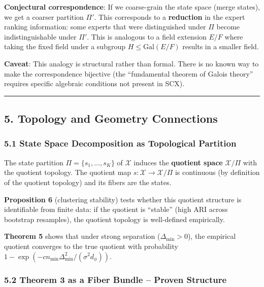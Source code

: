 \documentclass[
  12pt,
]{ctexart}
\begin{document}
\textbf{Conjectural correspondence}: If we coarse-grain the state space
(merge states), we get a coarser partition \(\Pi'\). This corresponds to
a \textbf{reduction} in the expert ranking information: some experts
that were distinguished under \(\Pi\) become indistinguishable under
\(\Pi'\). This is analogous to a field extension \(E/F\) where taking
the fixed field under a subgroup \(H \leq \text{Gal}(E/F)\) results in a
smaller field.

\textbf{Caveat}: This analogy is structural rather than formal. There is
no known way to make the correspondence bijective (the ``fundamental
theorem of Galois theory'' requires specific algebraic conditions not
present in SCX).

\begin{center}\rule{0.5\linewidth}{0.5pt}\end{center}

\subsection{5. Topology and Geometry
Connections}\label{topology-and-geometry-connections}

\subsubsection{5.1 State Space Decomposition as Topological
Partition}\label{state-space-decomposition-as-topological-partition}

The state partition \(\Pi = \{s_1, \dots, s_K\}\) of \(\mathcal{X}\)
induces the \textbf{quotient space} \(\mathcal{X}/\Pi\) with the
quotient topology. The quotient map
\(s: \mathcal{X} \to \mathcal{X}/\Pi\) is continuous (by definition of
the quotient topology) and its fibers are the states.

\textbf{Proposition 6} (clustering stability) tests whether this
quotient structure is identifiable from finite data: if the quotient is
``stable'' (high ARI across bootstrap resamples), the quotient topology
is well-defined empirically.

\textbf{Theorem 5} shows that under strong separation
(\(\Delta_{\min} > 0\)), the empirical quotient converges to the true
quotient with probability
\(1 - \exp(-c n_{\min} \Delta_{\min}^2 / (\sigma^2 d_\phi))\).

\subsubsection{5.2 Theorem 3 as a Fiber Bundle -- Proven
Structure}\label{theorem-3-as-a-fiber-bundle-proven-structure}
\end{document}
